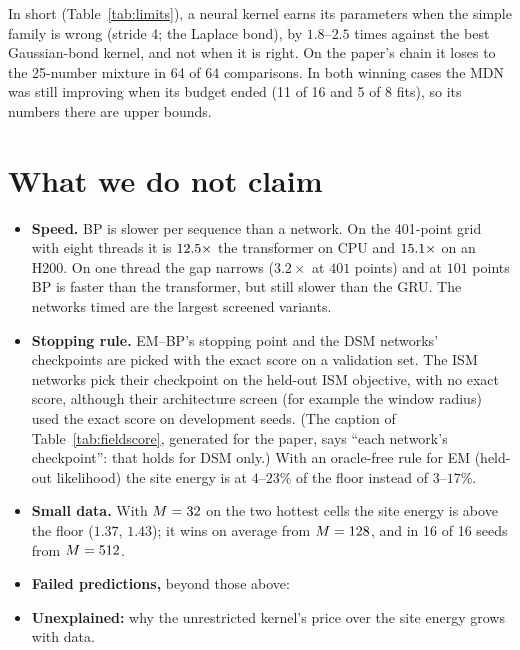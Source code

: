 \documentclass[11pt,a4paper]{article}
\begin{document}
In short (Table~\ref{tab:limits}), a neural kernel earns its parameters when the simple family is wrong (stride 4; the Laplace bond), by $1.8$--$2.5$ times
against the best Gaussian-bond kernel, and not when it is right. On the paper's chain it loses to the 25-number mixture in
64 of 64 comparisons. In both winning cases the MDN was still improving when its budget ended (11 of 16 and 5 of 8 fits), so its
numbers there are upper bounds.

\section{What we do not claim}
\label{app:honest}

\begin{itemize}
\item \textbf{Speed.} BP is slower per sequence than a network. On the 401-point grid with eight threads it is
$12.5\times$ the transformer on CPU and $15.1\times$ on an H200. On one thread the gap narrows ($3.2\times$ at
$401$ points) and at $101$ points BP is faster than the transformer, but still slower than the GRU. The networks timed are the
largest screened variants.
\item \textbf{Stopping rule.} EM--BP's stopping point and the DSM networks' checkpoints are picked with the exact score on a
validation set. The ISM networks pick their checkpoint on the held-out ISM objective, with no exact score, although their
architecture screen (for example the window radius) used the exact score on development seeds. (The caption of Table~\ref{tab:fieldscore}, generated
for the paper, says ``each network's checkpoint'': that holds for DSM only.) With an oracle-free rule for EM (held-out likelihood)
the site energy is at $4$--$23\%$ of the floor instead of $3$--$17\%$.
\item \textbf{Small data.} With $M=32$ on the two hottest cells the site energy is above the floor ($1.37$, $1.43$); it wins on
average from $M=128$, and in 16 of 16 seeds from $M=512$.
\item \textbf{Failed predictions,} beyond those above: 
\item \textbf{Unexplained:} why the unrestricted kernel's price over the site energy grows with data.
\end{itemize}
\end{document}
